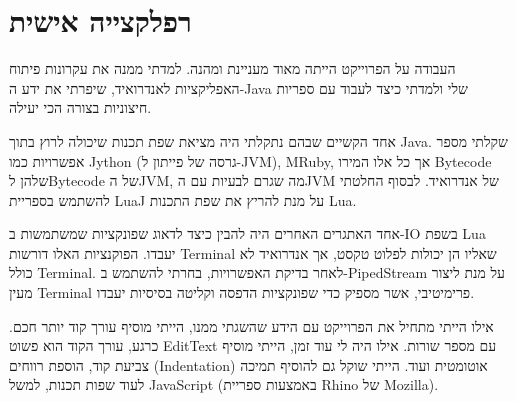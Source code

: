 \chapter{רפלקצייה אישית}

העבודה על הפרוייקט הייתה מאוד מעניינת ומהנה.
למדתי ממנה את עקרונות פיתוח האפליקציות לאנדרואיד,
שיפרתי את ידע ה-Java שלי ולמדתי כיצד לעבוד עם ספריות חיצוניות בצורה הכי יעילה.

אחד הקשיים שבהם נתקלתי היה מציאת שפת תכנות שיכולה לרוץ בתוך Java.
שקלתי מספר אפשרויות כמו Jython (גרסה של פייתון ל-JVM), MRuby, אך כל אלו המירו Bytecode שלהן לBytecode של הJVM, מה שגרם לבעיות עם הJVM של אנדרואיד.
לבסוף החלטתי להשתמש בספריית LuaJ על מנת להריץ את שפת התכנות Lua.

אחד האתגרים האחרים היה להבין כיצד לדאוג שפונקציות שמשתמשות ב-IO בשפת Lua יעבדו.
הפוקנציות האלו דורשות Terminal שאליו הן יכולות לפלוט טקסט, אך אנדרואיד לא כולל Terminal.
לאחר בדיקת האפשרויות, בחרתי להשתמש ב-PipedStream על מנת ליצור מעין Terminal פרימיטיבי,
אשר מספיק כדי שפונקציות הדפסה וקליטה בסיסיות יעבדו.

אילו הייתי מתחיל את הפרוייקט עם הידע שהשגתי ממנו, הייתי מוסיף עורך קוד יותר חכם.
כרגע, עורך הקוד הוא פשוט EditText עם מספר שורות.
אילו היה לי עוד זמן, הייתי מוסיף צביעת קוד, הוספת רווחים (Indentation) אוטומטית ועוד.
הייתי שוקל גם להוסיף תמיכה לעוד שפות תכנות, למשל JavaScript (באמצעות ספריית Rhino של Mozilla).